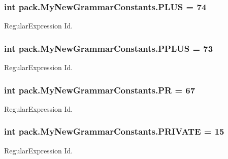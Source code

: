 \subsubsection[{\texorpdfstring{P\+L\+US}{PLUS}}]{\setlength{\rightskip}{0pt plus 5cm}int pack.\+My\+New\+Grammar\+Constants.\+P\+L\+US = 74}\hypertarget{interfacepack_1_1_my_new_grammar_constants_a5a0d2cd55861a2fb4c71e3f49a01d08a}{}\label{interfacepack_1_1_my_new_grammar_constants_a5a0d2cd55861a2fb4c71e3f49a01d08a}
Regular\+Expression Id. 
\subsubsection[{\texorpdfstring{P\+P\+L\+US}{PPLUS}}]{\setlength{\rightskip}{0pt plus 5cm}int pack.\+My\+New\+Grammar\+Constants.\+P\+P\+L\+US = 73}\hypertarget{interfacepack_1_1_my_new_grammar_constants_a4cb142291cf1d036fae2323d80f46079}{}\label{interfacepack_1_1_my_new_grammar_constants_a4cb142291cf1d036fae2323d80f46079}
Regular\+Expression Id. 
\subsubsection[{\texorpdfstring{PR}{PR}}]{\setlength{\rightskip}{0pt plus 5cm}int pack.\+My\+New\+Grammar\+Constants.\+PR = 67}\hypertarget{interfacepack_1_1_my_new_grammar_constants_afb66d7723f7fa64780beb0db6c436644}{}\label{interfacepack_1_1_my_new_grammar_constants_afb66d7723f7fa64780beb0db6c436644}
Regular\+Expression Id. 
\subsubsection[{\texorpdfstring{P\+R\+I\+V\+A\+TE}{PRIVATE}}]{\setlength{\rightskip}{0pt plus 5cm}int pack.\+My\+New\+Grammar\+Constants.\+P\+R\+I\+V\+A\+TE = 15}\hypertarget{interfacepack_1_1_my_new_grammar_constants_ae0e0a33839a1ce01840b3054e50026b2}{}\label{interfacepack_1_1_my_new_grammar_constants_ae0e0a33839a1ce01840b3054e50026b2}
Regular\+Expression Id. 
